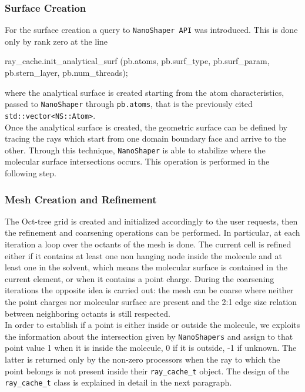 \documentclass[11pt,a4paper]{article}
\begin{document}
\subsubsection{Surface Creation}
For the surface creation a query to \texttt{NanoShaper API} was introduced. This is done only by rank zero at the line
\begin{code}
ray_cache.init_analytical_surf (pb.atoms, pb.surf_type, pb.surf_param,    
                                     pb.stern_layer, pb.num_threads);
\end{code}
where the analytical surface is created starting from the atom characteristics, passed to \texttt{NanoShaper} through \texttt{pb.atoms}, that is the previously cited \texttt{std::vector<NS::Atom>}. \\
Once the analytical surface is created, the geometric surface can be defined by tracing the rays which start from one domain boundary face and arrive to the other. Through this technique, \texttt{NanoShaper} is able to stabilize where the molecular surface intersections occurs. This operation is performed in the following step.

\subsubsection{Mesh Creation and Refinement}
The Oct-tree grid is created and initialized accordingly to the user requests, then the refinement and coarsening operations can be performed. In
particular, at each iteration a loop over the octants of the mesh is done. The current cell is refined either if it contains at least one non hanging node inside the molecule and at least one in the solvent, which means the molecular surface is contained in the current element, or when it contains a point charge. During the coarsening iterations the
opposite idea is carried out: the mesh can be coarse where neither the point charges nor molecular surface are present and the 2:1 edge size relation between neighboring
octants is still respected. \\
In order to establish if a point is either inside or outside the molecule, we exploits the information about the intersection given by \texttt{NanoShapers} and assign to that point value 1 when it is inside the molecule, 0 if it is outside, -1 if unknown. The latter is returned only by the non-zero processors when the ray to which the point belongs is not present inside their \texttt{ray\_cache\_t} object. The design of the \texttt{ray\_cache\_t} class is explained in detail in the next paragraph. 
\end{document}
